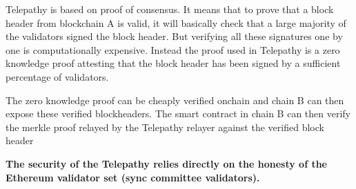 Telepathy is based on proof of consensus. It means that to prove that a block header from blockchain A is valid, it will basically check that a large majority of the validators signed the block header. But verifying all these signatures one by one is computationally expensive. Instead the proof used in Telepathy is a zero knowledge proof attesting that the block header has been signed by a sufficient percentage of validators. 

The zero knowledge proof can be cheaply verified onchain and chain B can then expose these verified blockheaders.
The smart contract in chain B can then verify the merkle proof relayed by the Telepathy relayer against the verified block header 

\textbf{The security of the Telepathy relies directly on the honesty of the Ethereum validator set (sync committee validators).
}

